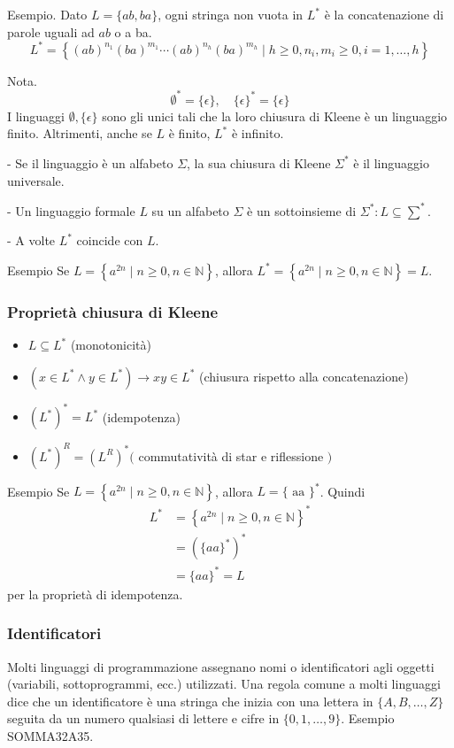Esempio. Dato $L=\{a b, b a\}$, ogni stringa non vuota in $L^{*}$ è la concatenazione di parole uguali ad $a b$ o a ba.
$$
L^{*}=\left\{(a b)^{n_{1}}(b a)^{m_{1}} \cdots(a b)^{n_{h}}(b a)^{m_{h}} \mid h \geq 0, n_{i}, m_{i} \geq 0, i=1, \ldots, h\right\}
$$

Nota.
$$
\emptyset^{*}=\{\epsilon\}, \quad\{\epsilon\}^{*}=\{\epsilon\}
$$
I linguaggi $\emptyset,\{\epsilon\}$ sono gli unici tali che la loro chiusura di Kleene è un linguaggio finito. Altrimenti, anche se $L$ è finito, $L^{*}$ è infinito.

- Se il linguaggio è un alfabeto $\Sigma$, la sua chiusura di Kleene $\Sigma^{*}$ è il linguaggio universale.

- Un linguaggio formale $L$ su un alfabeto $\Sigma$ è un sottoinsieme di $\Sigma^{*}: L \subseteq \sum^{*} .$

- A volte $L^{*}$ coincide con $L$.

Esempio Se $L=\left\{a^{2 n} \mid n \geq 0, n \in \mathbb{N}\right\}$, allora $L^{*}=\left\{a^{2 n} \mid n \geq 0, n \in \mathbb{N}\right\}=L .$

\subsubsection{Proprietà chiusura di Kleene}
\begin{itemize}
    \item $L \subseteq L^{*}$ (monotonicità)
    \item $\left(x \in L^{*} \wedge y \in L^{*}\right) \rightarrow x y \in L^{*}$ (chiusura rispetto alla concatenazione)
    \item $\left(L^{*}\right)^{*}=L^{*}$ (idempotenza)
    \item $\left(L^{*}\right)^{R}=\left(L^{R}\right)^{*}($ commutatività di star e riflessione $)$
\end{itemize}
Esempio Se $L=\left\{a^{2 n} \mid n \geq 0, n \in \mathbb{N}\right\}$, allora $L=\{\text { aa }\}^{*}$. Quindi
$$
\begin{aligned}
L^{*} &=\left\{a^{2 n} \mid n \geq 0, n \in \mathbb{N}\right\}^{*} \\
&=\left(\{a a\}^{*}\right)^{*} \\
&=\{a a\}^{*}=L
\end{aligned}
$$
per la proprietà di idempotenza.
\subsubsection{Identificatori}
Molti linguaggi di programmazione assegnano nomi o identificatori agli oggetti (variabili, sottoprogrammi, ecc.) utilizzati.
Una regola comune a molti linguaggi dice che un identificatore è una stringa che inizia con una lettera in $\{A, B, \ldots, Z\}$ seguita da un numero qualsiasi di lettere e cifre in $\{0,1, \ldots, 9\}$.
Esempio SOMMA32A35.

